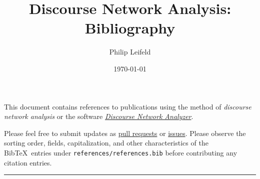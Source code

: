 \documentclass[a4paper, 11pt]{article}
\title{Discourse Network Analysis: Bibliography}
\author{Philip Leifeld}
\date{\today}
\begin{document}
\maketitle

This document contains references to publications using the method of \emph{discourse network analysis} or the software \href{https://github.com/leifeld/dna/}{\emph{Discourse Network Analyzer}}.

Please feel free to submit updates as \href{https://github.com/leifeld/dna/pulls}{pull requests} or \href{https://github.com/leifeld/dna/issues}{issues}.
Please observe the sorting order, fields, capitalization, and other characteristics of the Bib\TeX\ entries under \verb+references/references.bib+ before contributing any citation entries.

\nocite{*}

\bigskip

\hrule



\end{document}
